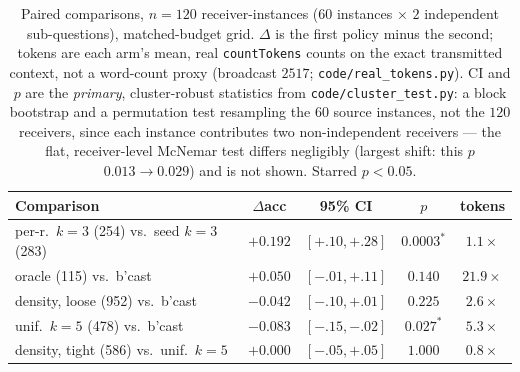 \documentclass[sigconf,anonymous]{aamas}
\theoremstyle{remark}
\begin{document}
\begin{table}[t]
\centering
\caption{Paired comparisons, $n=120$ receiver-instances ($60$
instances $\times$ $2$ independent sub-questions), matched-budget
grid. $\Delta$ is the first policy minus the second; tokens are each
arm's mean, real \texttt{countTokens} counts on the exact transmitted
context, not a word-count proxy (broadcast $2517$;
\texttt{code/real\_tokens.py}). CI and $p$ are the \emph{primary},
cluster-robust statistics from \texttt{code/cluster\_test.py}: a block
bootstrap and a permutation test resampling the $60$ source instances,
not the $120$ receivers, since each instance contributes two
non-independent receivers --- the flat, receiver-level McNemar test
differs negligibly (largest shift: this $p$ $0.013\to0.029$) and is not
shown. Starred $p<0.05$.}
\label{tab:main}
\footnotesize
\setlength{\tabcolsep}{3pt}
\begin{tabular}{lcccc}
\toprule
Comparison & $\Delta$acc & 95\% CI & $p$ & tokens \\
\midrule
per-r.\ $k{=}3$ (254) vs.\ seed $k{=}3$ (283) & $+0.192$ & $[+.10,+.28]$ & $0.0003^{*}$ & $1.1\times$ \\
oracle (115) vs.\ b'cast & $+0.050$ & $[-.01,+.11]$ & $0.140$      & $21.9\times$ \\
density, loose (952) vs.\ b'cast & $-0.042$ & $[-.10,+.01]$ & $0.225$   & $2.6\times$ \\
unif.\ $k{=}5$ (478) vs.\ b'cast & $-0.083$ & $[-.15,-.02]$ & $0.027^{*}$ & $5.3\times$ \\
density, tight (586) vs.\ unif.\ $k{=}5$ & $+0.000$ & $[-.05,+.05]$ & $1.000$  & $0.8\times$ \\
\bottomrule
\end{tabular}
\end{table}
\end{document}
